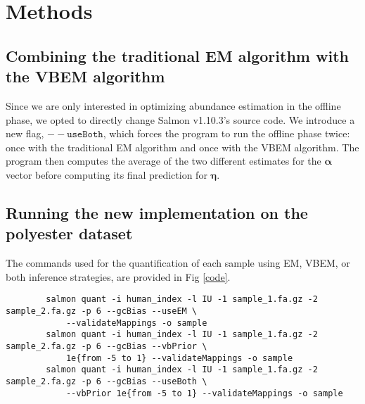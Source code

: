 \section{Methods}
\subsection{Combining the traditional EM algorithm with the VBEM algorithm}
Since we are only interested in optimizing abundance estimation in the offline phase, we opted to directly change Salmon v1.10.3’s 
source code. We introduce a new flag, $\mathtt{--useBoth}$, which forces the program to run the offline phase twice: 
once with the traditional EM algorithm and once with the VBEM algorithm. 
The program then computes the average of the two different estimates for the $\pmb{\alpha}$ vector before computing its final 
prediction for $\pmb{\eta}$.

\subsection{Running the new implementation on the polyester dataset}
The commands used for the quantification of each sample using EM, VBEM, or both inference strategies, are provided in Fig \ref{code}.
\begin{figure*}[!t]%
    \centering
    {        
        \begin{verbatim}
        salmon quant -i human_index -l IU -1 sample_1.fa.gz -2 sample_2.fa.gz -p 6 --gcBias --useEM \
            --validateMappings -o sample
        salmon quant -i human_index -l IU -1 sample_1.fa.gz -2 sample_2.fa.gz -p 6 --gcBias --vbPrior \
            1e{from -5 to 1} --validateMappings -o sample
        salmon quant -i human_index -l IU -1 sample_1.fa.gz -2 sample_2.fa.gz -p 6 --gcBias --useBoth \
            --vbPrior 1e{from -5 to 1} --validateMappings -o sample
    \end{verbatim}
    }
    \caption{Commands used for the quantification of each sample using EM, VBEM, or both inference strategies, respectively.}
    \label{code}
\end{figure*}

